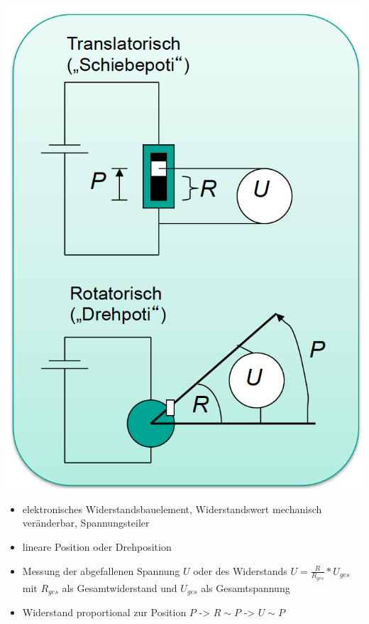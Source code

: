 \documentclass[paper=a4, fontsize=11pt]{scrartcl} %
\numberwithin{equation}{section} %
\numberwithin{figure}{section} %
\numberwithin{table}{section} %
\begin{document}
\begin{minipage}{0.3\textwidth}
\includegraphics[width=\textwidth]{imgs/poti}
\end{minipage}
\begin{minipage}{0.6\textwidth}
\begin{itemize}
\item elektronisches Widerstandsbauelement, Widerstandswert mechanisch veränderbar, Spannungsteiler
\item lineare Position oder Drehposition
\item Messung der abgefallenen Spannung $U$ oder des Widerstands $U = \frac{R}{R_{ges}} * U_{ges}$ mit $R_{ges}$ als Gesamtwiderstand und $U_{ges}$ als Gesamtspannung
\item Widerstand proportional zur Position $P$ -> $R \sim P$ -> $U \sim P$
\end{itemize}
\end{minipage}
\end{document}
